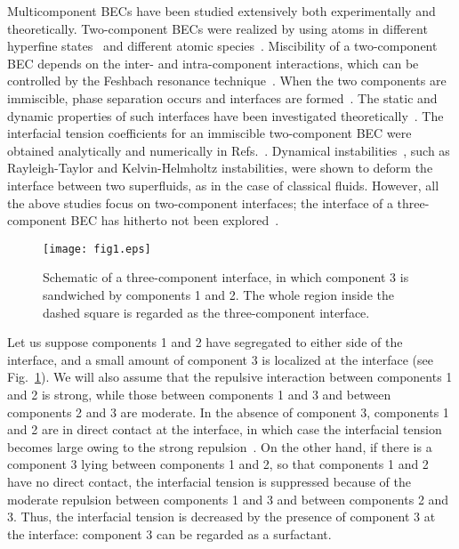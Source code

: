 \documentclass[pra,aps,superscriptaddress,twocolumn,color]{revtex4-1}
\begin{document}
Multicomponent BECs have been studied extensively both experimentally and
theoretically.
Two-component BECs were realized by using atoms in different hyperfine
states~\cite{Myatt} and different atomic species~\cite{Modugno}.
Miscibility of a two-component BEC depends on the inter- and
intra-component interactions, which can be controlled by the Feshbach
resonance technique~\cite{Papp, Tojo}.
When the two components are immiscible, phase separation occurs and
interfaces are formed~\cite{Hall, Miesner, Mertes, Eto}.
The static and dynamic properties of such interfaces have been investigated
theoretically~\cite{Ho, Pu, Timm, Ao, Tripp, Mazets, Barankov, Schae,
  Takeuchi2, Indekeu, Lee, Thu, Indekeu2}.
The interfacial tension coefficients for an immiscible two-component BEC
were obtained analytically and numerically in Refs.~\cite{Ao, Barankov,
  Schae}.
Dynamical instabilities~\cite{Sasaki, Gautam, Takeuchi, Bezett, Suzuki,
  Kobyakov, Sasaki11, Kadokura, Kobyakov2, Kobyakov3, Sakaguchi, Maity},
such as Rayleigh-Taylor and Kelvin-Helmholtz instabilities, were shown
to deform the interface between two superfluids, as in the case of classical
fluids.
However, all the above studies focus on two-component interfaces;
the interface of a three-component BEC has hitherto not been
explored~\cite{Note}.

\begin{figure}[tb]
\texttt{[image: fig1.eps]}
\caption{
  Schematic of a three-component interface, in which component 3 is
  sandwiched by components 1 and 2.
  The whole region inside the dashed square is regarded as the
  three-component interface.
}
\label{f:schematic}
\end{figure}
Let us suppose components 1 and 2 have segregated to either side of the
interface, and a small amount of component 3 is localized at the interface
(see Fig.~\ref{f:schematic}).
We will also assume that the repulsive interaction between components 1 and
2 is strong, while those between components 1 and 3 and between components 2
and 3 are moderate.
In the absence of component 3, components 1 and 2 are in direct contact at
the interface, in which case the interfacial tension becomes large owing to 
the strong repulsion~\cite{Ao, Barankov, Schae}.
On the other hand, if there is a component 3 lying between components 1 and
2, so that components 1 and 2 have no direct contact, the interfacial
tension is suppressed because of the moderate repulsion between components 1
and 3 and between components 2 and 3.
Thus, the interfacial tension is decreased by the presence of component 3 at
the interface: component 3 can be regarded as a surfactant.
\end{document}
